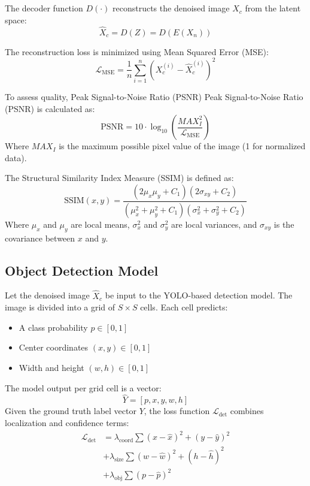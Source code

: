 \documentclass[12pt, conference]{IEEEtran}
\begin{document}
The decoder function $D(\cdot)$ reconstructs the denoised image $\hat{X}_c$ from the latent space:
$$\hat{X}_c = D(Z) = D(E(X_n))$$

The reconstruction loss is minimized using Mean Squared Error (MSE):
$$\mathcal{L}_{\text{MSE}} = \frac{1}{n} \sum_{i=1}^{n} (X_c^{(i)} - \hat{X}_c^{(i)})^2$$

To assess quality, Peak Signal-to-Noise Ratio (PSNR) Peak Signal-to-Noise Ratio (PSNR) \cite{hore2010image} is calculated as:
$$\text{PSNR} = 10 \cdot \log_{10} \left( \frac{MAX_I^2}{\mathcal{L}_{\text{MSE}}} \right)$$
Where $MAX_I$ is the maximum possible pixel value of the image (1 for normalized data).

The Structural Similarity Index Measure (SSIM) \cite{wang2004image} is defined as:
$$\text{SSIM}(x, y) = \frac{(2\mu_x \mu_y + C_1)(2\sigma_{xy} + C_2)}{(\mu_x^2 + \mu_y^2 + C_1)(\sigma_x^2 + \sigma_y^2 + C_2)}$$
Where $\mu_x$ and $\mu_y$ are local means, $\sigma_x^2$ and $\sigma_y^2$ are local variances, and $\sigma_{xy}$ is the covariance between $x$ and $y$.

\subsection{Object Detection Model}
Let the denoised image $\hat{X}_c$ be input to the YOLO-based \cite{redmon2016you} detection model. The image is divided into a grid of $S \times S$ cells. Each cell predicts:
\begin{itemize}
    \item A class probability $p \in [0,1]$
    \item Center coordinates $(x, y) \in [0,1]$
    \item Width and height $(w, h) \in [0,1]$
\end{itemize}

The model output per grid cell is a vector:
$$\hat{Y} = [p, x, y, w, h]$$
Given the ground truth label vector $Y$, the loss function $\mathcal{L}_{\text{det}}$ combines localization and confidence terms:
\begin{equation}
\begin{split}
\mathcal{L}_{\text{det}} &= \lambda_{\text{coord}} \sum (x - \hat{x})^2 + (y - \hat{y})^2 \\
&+ \lambda_{\text{size}} \sum (w - \hat{w})^2 + (h - \hat{h})^2 \\
&+ \lambda_{\text{obj}} \sum (p - \hat{p})^2
\end{split}
\label{eq:ldet} %
\end{equation}
\end{document}

